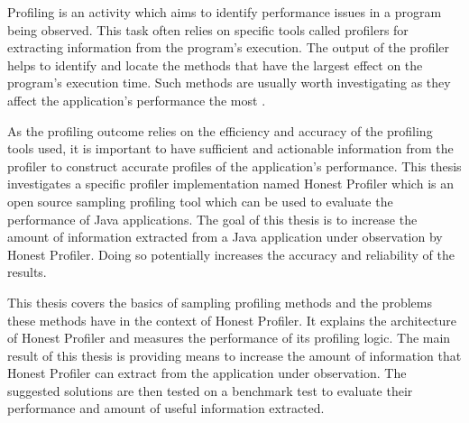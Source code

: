 \documentclass[..thesis.tex]{subfiles}
\begin{document}
Profiling is an activity which aims to identify performance issues in a program being observed. This task often relies on specific tools called profilers for extracting information from the program's execution. The output of the profiler helps to identify and locate the methods that have the largest effect on the program's execution time. Such methods are usually worth investigating as they affect the application's performance the most \cite{mytkowicz_evaluating_2010}.

As the profiling outcome relies on the efficiency and accuracy of the profiling tools used,   it is important to have sufficient and actionable information from the profiler to construct accurate profiles of the application's performance. This thesis investigates a specific profiler implementation named Honest Profiler which is an open source sampling profiling tool which can be used to evaluate the performance of Java applications. The goal of this thesis is to increase the amount of information extracted from a Java application under observation by Honest Profiler. Doing so potentially increases the accuracy and reliability of the results.  

This thesis covers the basics of sampling profiling methods and the problems these methods have in the context of Honest Profiler. It explains the architecture of Honest Profiler and measures the performance of its profiling logic. The main result of this thesis is providing means to increase the amount of information that Honest Profiler can extract from the application under observation. The suggested solutions are then tested on a benchmark test to evaluate their performance and amount of useful information extracted.

\end{document}
